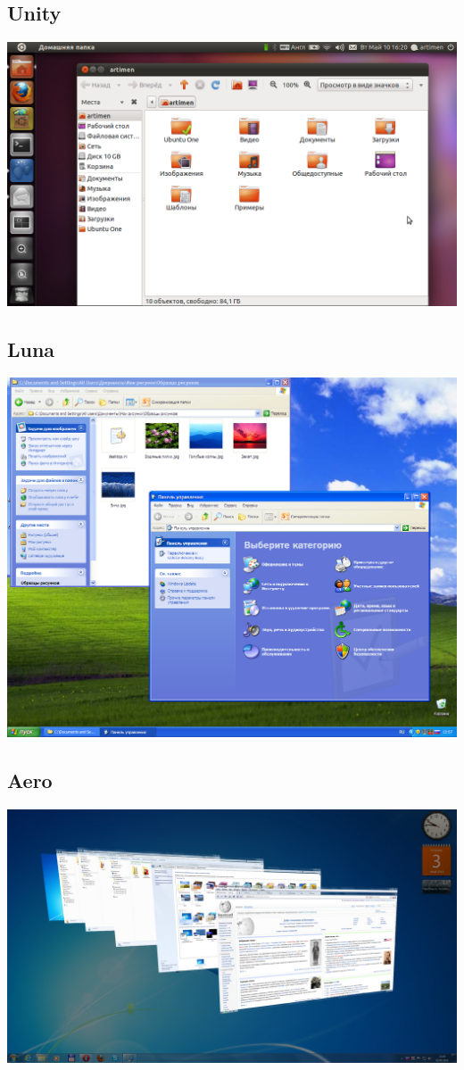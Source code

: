 \subsection{Unity}\label{base:software:de:unity}
\includegraphics[scale=0.35]{base/Software/Unity.png}
\subsection{Luna}\label{base:software:de:luna}
\includegraphics[scale=0.28]{base/Software/Luna.png}
\subsection{Aero}\label{base:software:de:aero}
\includegraphics[scale=0.25]{base/Software/Aero.jpg}
